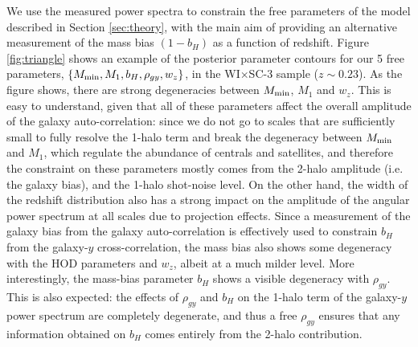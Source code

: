 \documentclass[useAMS,usenatbib]{mn2e}
\newcommand{\wisc}{WI$\times$SC}
\begin{document}
      We use the measured power spectra to constrain the free parameters of the model described in Section \ref{sec:theory}, with the main aim of providing an alternative measurement of the mass bias $(1-b_H)$ as a function of redshift. Figure \ref{fig:triangle} shows an example of the posterior parameter contours for our 5 free parameters, $\{M_{\rm min},M_1,b_H,\rho_{gy},w_z\}$, in the \wisc-3 sample ($z\sim0.23$). As the figure shows, there are strong degeneracies between $M_{\rm min}$, $M_1$ and $w_z$. This is easy to understand, given that all of these parameters affect the overall amplitude of the galaxy auto-correlation: since we do not go to scales that are sufficiently small to fully resolve the 1-halo term and break the degeneracy between $M_{\rm min}$ and $M_1$, which regulate the abundance of centrals and satellites, and therefore the constraint on these parameters mostly comes from the 2-halo amplitude (i.e. the galaxy bias), and the 1-halo shot-noise level. On the other hand, the width of the redshift distribution also has a strong impact on the amplitude of the angular power spectrum at all scales due to projection effects. Since a measurement of the galaxy bias from the galaxy auto-correlation is effectively used to constrain $b_H$ from the galaxy-$y$ cross-correlation, the mass bias also shows some degeneracy with the HOD parameters and $w_z$, albeit at a much milder level. More interestingly, the mass-bias parameter $b_H$ shows a visible degeneracy with $\rho_{gy}$. This is also expected: the effects of $\rho_{gy}$ and $b_H$ on the 1-halo term of the galaxy-$y$ power spectrum are completely degenerate, and thus a free $\rho_{gy}$ ensures that any information obtained on $b_H$ comes entirely from the 2-halo contribution.
      
\end{document}
